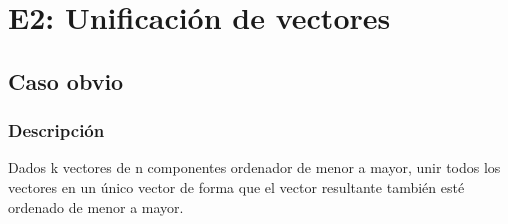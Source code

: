 \documentclass[13pt]{beamer}
\begin{document}





    \section{E2: Unificación de vectores}

    \subsection{Caso obvio}

    \begin{frame}
        \frametitle{Descripción}

        Dados k vectores de n componentes ordenador de menor a mayor, unir todos los vectores en un único vector de forma
        que el vector resultante también esté ordenado de menor a mayor.
    \end{frame}
\end{document}
